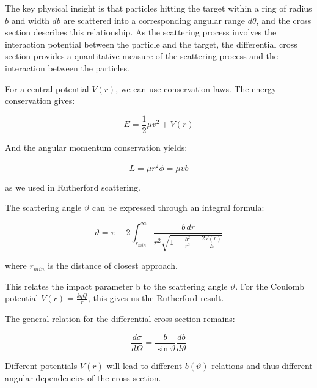 \documentclass[
  a4paper,
]{book}
\begin{document}
The key physical insight is that particles hitting the target within a
ring of radius \(b\) and width \(db\) are scattered into a corresponding
angular range \(d\theta\), and the cross section describes this
relationship. As the scattering process involves the interaction
potential between the particle and the target, the differential cross
section provides a quantitative measure of the scattering process and
the interaction between the particles.

\begin{tcolorbox}[enhanced jigsaw, coltitle=black, title=\textcolor{quarto-callout-note-color}{\faInfo}\hspace{0.5em}{Differential cross section and interaction potential}, colframe=quarto-callout-note-color-frame, toprule=.15mm, opacitybacktitle=0.6, left=2mm, opacityback=0, breakable, toptitle=1mm, bottomtitle=1mm, leftrule=.75mm, arc=.35mm, titlerule=0mm, colbacktitle=quarto-callout-note-color!10!white, rightrule=.15mm, bottomrule=.15mm, colback=white]

For a central potential \(V(r)\), we can use conservation laws. The
energy conservation gives:

\[
E = \frac{1}{2}\mu v^2 + V(r)
\]

And the angular momentum conservation yields:

\[
L = \mu r^2\dot{\phi} = \mu v b
\]

as we used in Rutherford scattering.

The scattering angle \(\vartheta\) can be expressed through an integral
formula:

\[
\vartheta = \pi - 2\int_{r_{min}}^{\infty} \frac{b\,dr}{r^2\sqrt{1-\frac{b^2}{r^2}-\frac{2V(r)}{E}}}
\]

where \(r_{min}\) is the distance of closest approach.

This relates the impact parameter b to the scattering angle
\(\vartheta\). For the Coulomb potential \(V(r) = \frac{kqQ}{r}\), this
gives us the Rutherford result.

The general relation for the differential cross section remains:

\[
\frac{d\sigma}{d\Omega} = \frac{b}{\sin\vartheta}\frac{db}{d\vartheta}
\]

Different potentials \(V(r)\) will lead to different \(b(\vartheta)\)
relations and thus different angular dependencies of the cross section.

\end{tcolorbox}
\end{document}

